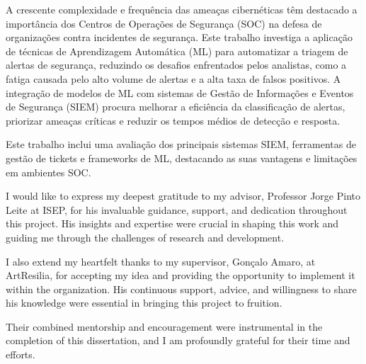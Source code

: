 \begin{abstractotherlanguage}

A crescente complexidade e frequência das ameaças cibernéticas têm destacado a importância dos Centros de Operações de Segurança (SOC) na defesa de organizações contra incidentes de segurança. 
Este trabalho investiga a aplicação de técnicas de Aprendizagem Automática (ML) para automatizar a triagem de alertas de segurança, reduzindo os desafios enfrentados pelos analistas, como a fatiga causada pelo alto volume de alertas e a alta taxa de falsos positivos. 
A integração de modelos de ML com sistemas de Gestão de Informações e Eventos de Segurança (SIEM) procura melhorar a eficiência da classificação de alertas, priorizar ameaças críticas e reduzir os tempos médios de detecção e resposta.

Este trabalho inclui uma avaliação dos principais sistemas SIEM, ferramentas de gestão de tickets e frameworks de ML, destacando as suas vantagens e limitações em ambientes SOC. 

\end{abstractotherlanguage}


\begin{acknowledgements}

I would like to express my deepest gratitude to my advisor, Professor Jorge Pinto Leite at ISEP, for his invaluable guidance, support, and dedication throughout this project. 
His insights and expertise were crucial in shaping this work and guiding me through the challenges of research and development.

I also extend my heartfelt thanks to my supervisor, Gonçalo Amaro, at ArtResilia, for accepting my idea and providing the opportunity to implement it within the organization. 
His continuous support, advice, and willingness to share his knowledge were essential in bringing this project to fruition.

Their combined mentorship and encouragement were instrumental in the completion of this dissertation, and I am profoundly grateful for their time and efforts.

\end{acknowledgements}

